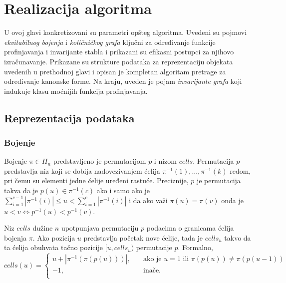 \documentclass[12pt,oneside]{memoir}
\theoremstyle{definition}
\begin{document}
\chapter{Realizacija algoritma}

 U ovoj glavi konkretizovani su parametri opšteg algoritma.  Uvedeni su pojmovi
 \emph{ekvitabilnog bojenja} i \emph{količničkog grafa} ključni za određivanje
 funkcije profinjavanja i invarijante stabla i prikazani su efikasni postupci
 za njihovo izračunavanje.  Prikazane su strukture podataka za reprezentaciju
 objekata uvedenih u prethodnoj glavi i opisan je kompletan algoritam pretrage
 za određivanje kanonske forme. Na kraju, uveden je pojam \emph{invarijante
 grafa} koji indukuje klasu moćnijih funkcija profinjavanja.

 \section{Reprezentacija podataka}

  \subsection{Bojenje}

   Bojenje $\pi \in \Pi_n$ predstavljeno je permutacijom $p$ i nizom $cells$.
   Permutacija $p$ predstavlja niz koji se dobija nadovezivanjem ćelija
   $\pi^{-1}(1), \dots, \pi^{-1}(k)$ redom, pri čemu su elementi jedne ćelije
   uređeni rastuće. Preciznije, $p$ je permutacija takva da je $p(u) \in
   \pi^{-1}(c)$ ako i samo ako je $\sum_{i = 1}^{c-1} |\pi^{-1}(i)| \leq u <
   \sum_{i = 1}^c |\pi^{-1}(i)|$ i da ako važi $\pi(u) = \pi(v)$ onda je $u < v
   \iff p^{-1}(u) < p^{-1}(v)$.

   Niz $cells$ dužine $n$ upotpunjava permutaciju $p$ podacima o granicama
   ćelija bojenja $\pi$. Ako pozicija $u$ predstavlja početak nove ćelije, tada
   je $cells_u$ takvo da ta ćelija obuhvata tačno pozicije $[u, cells_u)$
   permutacije $p$.  Formalno,
   $$ cells(u) =
     \begin{cases}
		 u + |\pi^{-1}(\pi(p(u)))|, & \quad \text{ako je } u = 1 \text{ ili }
		 \pi(p(u)) \neq \pi(p(u-1)) \\
		 -1, & \quad \text{inače.} \\
	 \end{cases}
   $$
\end{document}
